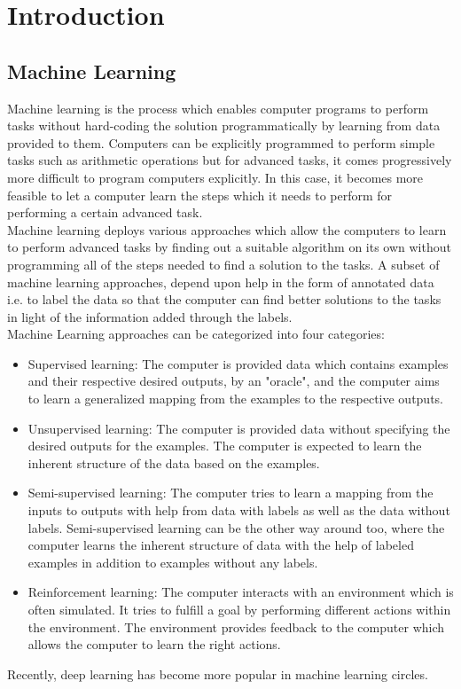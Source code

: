
\chapter{Introduction}\label{chapter:introduction}

\section{Machine Learning}
Machine learning is the process which enables computer programs to perform tasks without hard-coding the solution programmatically by learning from data provided to them. Computers can be explicitly programmed to perform simple tasks such as arithmetic operations but for advanced tasks, it comes progressively more difficult to program computers explicitly. In this case, it becomes more feasible to let a computer learn the steps which it needs to perform for performing a certain advanced task. \\
Machine learning deploys various approaches which allow the computers to learn to perform advanced tasks by finding out a suitable algorithm on its own without programming all of the steps needed to find a solution to the tasks. A subset of machine learning approaches, depend upon help in the form of annotated data i.e. to label the data so that the computer can find better solutions to the tasks in light of the information added through the labels. \\
Machine Learning approaches can be categorized into four categories:
\begin{itemize}
  \setlength\itemsep{0em}
  \item Supervised learning: The computer is provided data which contains examples and their respective desired outputs, by an "oracle", and the computer aims to learn a generalized mapping from the examples to the respective outputs.
  \item Unsupervised learning: The computer is provided data without specifying the desired outputs for the examples. The computer is expected to learn the inherent structure of the data based on the examples.
  \item Semi-supervised learning: The computer tries to learn a mapping from the inputs to outputs with help from data with labels as well as the data without labels. Semi-supervised learning can be the other way around too, where the computer learns the inherent structure of data with the help of labeled examples in addition to examples without any labels.
  \item Reinforcement learning: The computer interacts with an environment which is often simulated. It tries to fulfill a goal by performing different actions within the environment. The environment provides feedback to the computer which allows the computer to learn the right actions.
\end{itemize}
Recently, deep learning has become more popular in machine learning circles.


